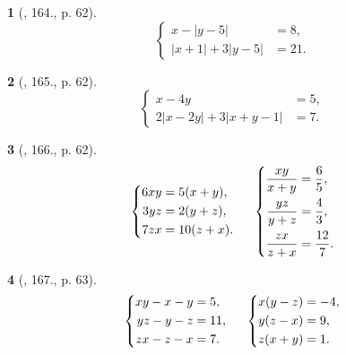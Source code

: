 \documentclass{article}
\newtheorem{baitoan}{}
\begin{document}
\begin{baitoan}[\cite{Tuyen_Toan_9_old}, 164., p. 62]
	\begin{equation*}
		\left\{\begin{split}
			x - |y - 5| &= 8,\\
			|x + 1| + 3|y - 5| &= 21.
		\end{split}\right.
	\end{equation*}
\end{baitoan}

\begin{baitoan}[\cite{Tuyen_Toan_9_old}, 165., p. 62]
	\begin{equation*}
		\left\{\begin{split}
			x - 4y &= 5,\\
			2|x - 2y| + 3|x + y - 1| &= 7.
		\end{split}\right.
	\end{equation*}
\end{baitoan}

\begin{baitoan}[\cite{Tuyen_Toan_9_old}, 166., p. 62]
	\begin{equation*}
		\left\{\begin{split}
			6xy &= 5(x + y),\\
			3yz &= 2(y + z),\\
			7zx &= 10(z + x).
		\end{split}\right.\hspace{5mm}\left\{\begin{split}
		\frac{xy}{x + y} &= \frac{6}{5},\\
		\frac{yz}{y + z} &= \frac{4}{3},\\
		\frac{zx}{z + x} &= \frac{12}{7}.
		\end{split}\right.
	\end{equation*}
\end{baitoan}

\begin{baitoan}[\cite{Tuyen_Toan_9_old}, 167., p. 63]
	\begin{equation*}
		\left\{\begin{split}
			xy - x - y &= 5,\\
			yz - y - z &= 11,\\
			zx - z - x &= 7.
		\end{split}\right.\hspace{5mm}\left\{\begin{split}
			x(y - z) &= -4,\\
			y(z - x) &= 9,\\
			z(x + y) &= 1.
		\end{split}\right.
	\end{equation*}
\end{baitoan}
\end{document}
